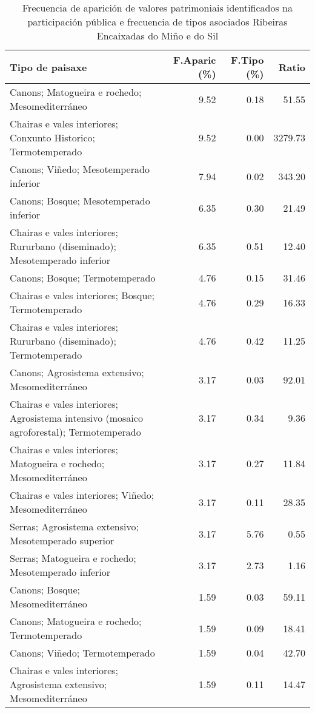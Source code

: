 \begin{table}[p]
\centering
\caption{Frecuencia de aparición de valores patrimoniais identificados na participación pública e frecuencia de tipos asociados Ribeiras Encaixadas do Miño e do Sil} 
\label{vsixotpat4}
\begin{tabular}{lrrr}
  \hline
Tipo de paisaxe & F.Aparic (\%) & F.Tipo (\%) & Ratio \\ 
  \hline
Canons; Matogueira e rochedo; Mesomediterráneo & 9.52 & 0.18 & 51.55 \\ 
  Chairas e vales interiores; Conxunto Historico; Termotemperado & 9.52 & 0.00 & 3279.73 \\ 
  Canons; Viñedo; Mesotemperado inferior & 7.94 & 0.02 & 343.20 \\ 
  Canons; Bosque; Mesotemperado inferior & 6.35 & 0.30 & 21.49 \\ 
  Chairas e vales interiores; Rururbano (diseminado); Mesotemperado inferior & 6.35 & 0.51 & 12.40 \\ 
  Canons; Bosque; Termotemperado & 4.76 & 0.15 & 31.46 \\ 
  Chairas e vales interiores; Bosque; Termotemperado & 4.76 & 0.29 & 16.33 \\ 
  Chairas e vales interiores; Rururbano (diseminado); Termotemperado & 4.76 & 0.42 & 11.25 \\ 
  Canons; Agrosistema extensivo; Mesomediterráneo & 3.17 & 0.03 & 92.01 \\ 
  Chairas e vales interiores; Agrosistema intensivo (mosaico agroforestal); Termotemperado & 3.17 & 0.34 & 9.36 \\ 
  Chairas e vales interiores; Matogueira e rochedo; Mesomediterráneo & 3.17 & 0.27 & 11.84 \\ 
  Chairas e vales interiores; Viñedo; Mesomediterráneo & 3.17 & 0.11 & 28.35 \\ 
  Serras; Agrosistema extensivo; Mesotemperado superior & 3.17 & 5.76 & 0.55 \\ 
  Serras; Matogueira e rochedo; Mesotemperado inferior & 3.17 & 2.73 & 1.16 \\ 
  Canons; Bosque; Mesomediterráneo & 1.59 & 0.03 & 59.11 \\ 
  Canons; Matogueira e rochedo; Termotemperado & 1.59 & 0.09 & 18.41 \\ 
  Canons; Viñedo; Termotemperado & 1.59 & 0.04 & 42.70 \\ 
  Chairas e vales interiores; Agrosistema extensivo; Mesomediterráneo & 1.59 & 0.11 & 14.47 \\ 

\end{tabular}
\end{table}

